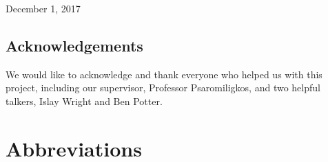 \documentclass[11pt]{article}
\begin{document}
\begin{titlepage}
	
	
	\vfill\vfill\vfill %
	
	{\large December 1, 2017} 
	
	\vfill %
\end{titlepage}
\begin{abstract}

\end{abstract}
\pagebreak

\begin{center}
\section*{Acknowledgements}
\end{center}
We would like to acknowledge and thank everyone who helped us with this project, including our supervisor, Professor Psaromiligkos, and two helpful talkers, Islay Wright and Ben Potter.
\pagebreak
\tableofcontents
\pagebreak
\cleardoublepage
{}
\listoffigures
\pagebreak
\section*{Abbreviations}


\pagebreak
\end{document}
